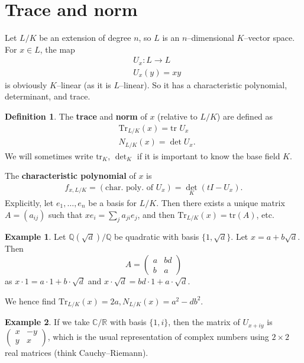 \documentclass{article}
\theoremstyle{definition}
\newtheorem{example}{Example}[section]
\newtheorem{defn}{Definition}[section]
\begin{document}
\section{Trace and norm}
Let $L/K$ be an extension of degree $n$, so $L$ is an $n$--dimensional $K$--vector space. For $x \in L$, the map 
\begin{align*}
    &U_x : L \to L \\
    &U_x(y) = xy
\end{align*}
is obviously $K$--linear (as it is $L$--linear). So it has a characteristic polynomial, determinant, and trace.
\begin{defn}
    The \textbf{trace} and \textbf{norm} of $x$ (relative to $L/K$) are defined as 
    \begin{align*}
        &\text{Tr}_{L/K}(x) = \text{tr }U_x \\
        &N_{L/K}(x)=\det U_x.
    \end{align*}
    We will sometimes write $\text{tr}_K$, $\det_K$ if it is important to know the base field $K$.
    \vspace{1mm}
    
    The \textbf{characteristic polynomial} of $x$ is 
    \begin{align*}
        f_{x,L/K} = (\text{char. poly. of }U_x)= {\det}_K(t I - U_x).
    \end{align*}
    Explicitly, let $e_1,\ldots,e_n$ be a basis for $L/K$. Then there exists a unique matrix $A=(a_{ij})$ such that $x e_i = \sum_{j}^{} a_{ji}e_j$, and then $\text{Tr}_{L/K}(x)=\text{tr}(A)$, etc.
\end{defn}
\begin{example}
    Let $\mathbb{Q}(\sqrt{d})/\mathbb{Q}$ be quadratic with basis $\{1,\sqrt{d}\}$. Let $x=a+b\sqrt{d}$. Then \[
    A = \begin{pmatrix} a & bd \\ b & a \end{pmatrix}
    \] as $x \cdot 1 = a \cdot 1 + b \cdot  \sqrt{d}$ and $x \cdot \sqrt{d} = bd \cdot 1 + a \cdot \sqrt{d}$.
    \vspace{1mm}
    
    We hence find $\text{Tr}_{L/K}(x)=2a, N_{L/K}(x)=a^2-db^2$.
\end{example}
\begin{example}
    If we take $\mathbb{C}/\mathbb{R}$ with basis $\{1,i\}$, then the matrix of $U_{x+iy}$ is $\begin{pmatrix} x & -y\\y & x \end{pmatrix}$, which is the usual representation of complex numbers using $2\times 2$ real matrices (think Cauchy--Riemann).
\end{example}
\end{document}
